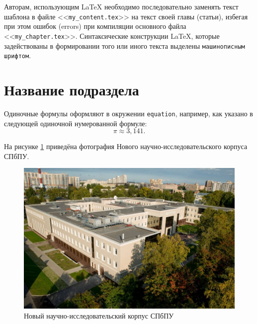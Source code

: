 \begin{refsection}
Авторам, использующим \LaTeX{} необходимо последовательно заменять текст шаблона в файле <<\verb|my_content.tex|>> на текст своей главы (статьи), избегая при этом ошибок (errors) при компиляции основного файла <<\verb|my_chapter.tex|>>. Синтаксические конструкции \LaTeX, которые задействованы в формировании того или иного текста выделены \texttt{машинописным шрифтом}.

	\section{Название подраздела} \label{ch-11:title-abbr} %


Одиночные формулы оформляют в окружении \texttt{equation}, например, как указано в следующей одиночной нумерованной формуле:
	\begin{equation}
	\label{eq:Pi}
	 \pi \approx 3,141.
	\end{equation}


	


На рисунке \ref{fig:spbpu-new-bld-autumn} приведёна фотография Нового научно-исследовательского корпуса СПбПУ.

	\begin{figure}[ht] 
	\center
	\includegraphics [scale=0.27] {my_folder/images/spbpu_new_bld_autumn}
	\caption{Новый научно-исследовательский корпус СПбПУ \cite{spbpu-gallery}} 
	\label{fig:spbpu-new-bld-autumn}  
	\end{figure}
	



\end{refsection}

